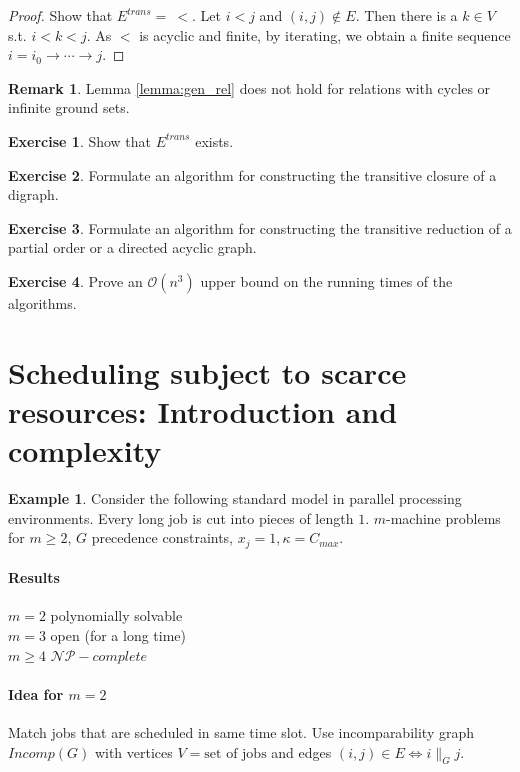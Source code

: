 \documentclass[11pt,a4paper,notitlepage]{article}
\providecommand{\NP}{\mathcal{NP}}
\providecommand{\Oh}{\mathcal{O}} %
\theoremstyle{plain}
\theoremstyle{definition}
\newtheorem{remark}[defn]{Remark}
\newtheorem{example}[defn]{Example}
\newtheorem{exercise}{Exercise}
\begin{document}
\begin{proof}
  Show that $E^{trans} =\ <$. Let $i<j$ and $(i,j)\not\in E$. Then there is a
  $k\in V$ s.t. $i<k<j$. As $<$ is acyclic and finite, by iterating, we obtain
  a finite sequence $i=i_{0}\rightarrow \cdots \rightarrow j$.
\end{proof}

\begin{remark}
  Lemma \ref{lemma:gen_rel} does not hold for relations with cycles or infinite
  ground sets.
\end{remark}

\begin{exercise}
  Show that $E^{trans}$ exists.
\end{exercise}

\begin{exercise}
  Formulate an algorithm for constructing the transitive closure of a digraph.
\end{exercise}

\begin{exercise}
  Formulate an algorithm for constructing the transitive reduction of a partial
  order or a directed acyclic graph.
\end{exercise}

\begin{exercise}
  Prove an $\Oh(n^{3})$ upper bound on the running times of the algorithms.
\end{exercise}


\section{Scheduling subject to scarce resources: Introduction and complexity}
\label{sec:resource_constrained_scheduling}


\begin{example}
  Consider the following standard model in parallel processing environments.
  Every long job is cut into pieces of length $1$. $m$-machine problems for
  $m\geq 2$, $G$ precedence constraints, $x_j = 1, \kappa = C_{max}$.

  \paragraph{Results}

  $m=2$ polynomially solvable\\
  $m=3$ open (for a long time)\\
  $m \geq 4$ $\NP-complete$

  \paragraph{Idea for $m=2$}
  Match jobs that are scheduled in same time slot. Use incomparability graph
  $Incomp(G)$ with vertices $V=\text{set of jobs}$ and edges
  $(i,j)\in E\Leftrightarrow i\parallel_G j$.
\end{example}
\end{document}
